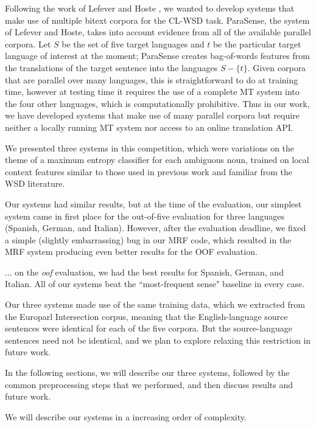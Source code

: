 \documentclass[11pt,letterpaper]{article}
\begin{document}
Following the work of Lefever and Hoste
, we wanted to develop systems
that make use of multiple bitext corpora for the CL-WSD task.  ParaSense, the
system of Lefever and Hoste, takes into account evidence from all of the
available parallel corpora. Let $S$ be the set of five target languages and $t$
be the particular target language of interest at the moment; ParaSense creates
bag-of-words features from the translations of the target sentence into the
languages $S - \lbrace{t \rbrace}$. Given corpora that are parallel over many
languages, this is straightforward to do at training time, however at testing
time it requires the use of a complete MT system into the four other languages,
which is computationally prohibitive. Thus in our work, we have developed
systems that make use of many parallel corpora but require neither a locally
running MT system nor access to an online translation API.

We presented three systems in this competition, which were variations on the
theme of a maximum entropy classifier for each ambiguous noun, trained on local
context features similar to those used in previous work and familiar from the
WSD literature.

Our systems had similar results, but at the time of the evaluation, our
simplest system came in first place for the out-of-five evaluation for three
languages (Spanish, German, and Italian).  However, after the evaluation
deadline, we fixed a simple (slightly embarrassing) bug in our MRF code, which
resulted in the MRF system producing even better results for the OOF
evaluation.

... on the \emph{oof} evaluation, we had the best results for Spanish, German,
and Italian.  All of our systems beat the ``most-frequent sense" baseline in
every case.

Our three systems made use of the same training data, which we extracted from
the Europarl Intersection corpus, meaning that the English-language source
sentences were identical for each of the five corpora. But the source-language
sentences need not be identical, and we plan to explore relaxing this
restriction in future work.

In the following sections, we will describe our three systems, followed by the
common preprocessing steps that we performed, and then discuss results and
future work.

We will describe our systems in a increasing order of complexity.
\end{document}
